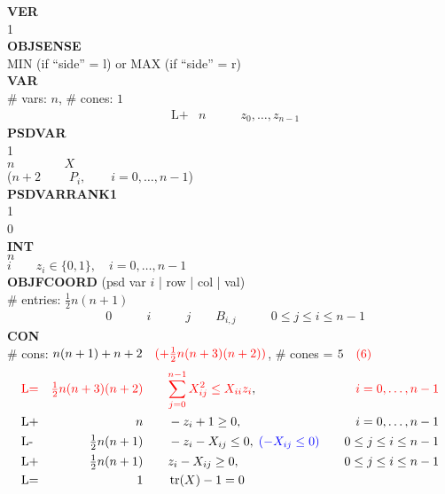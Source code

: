\documentclass[11pt,a4paper]{article}
\DeclareMathOperator{\tr}{tr}
\theoremstyle{definition}
\begin{document}
{\footnotesize
\noindent
\textbf{VER} \\
1 \\
\textbf{OBJSENSE} \\
MIN (if ``side'' = l) \; or \; MAX (if ``side'' = r) \\
\textbf{VAR} \\
\# vars:  $n$, \qquad \# cones: $1$ \\
\[
  \begin{aligned}
    &\text{L+} &n \qquad & z_0,\dots,z_{n-1}
  \end{aligned}
\]
\textbf{PSDVAR} \\
1  \\
$n \qquad \qquad X$ \\
{\color{red} ($n+2 \qquad \; P_i, \qquad i = 0,\dots,n-1$)}\\
{\color{green}\textbf{PSDVARRANK1}  \\
1 \\
0\\}
\textbf{INT} \\
$n$ \\
$i \qquad z_i \in \{0,1\}, \quad i = 0,\dots,n-1$ \\
\textbf{OBJFCOORD} (psd var $i$ | row | col | val) \\
\# entries: $\tfrac{1}{2}n(n+1)$\\
\[
  \begin{aligned}
    &0 \qquad &i \qquad &j \qquad B_{i,j} \qquad & 0\leq j \leq i \leq n-1
  \end{aligned}
\]
\textbf{CON} \\
\# cons: $n(n+1)+n+2 \quad {\color{red}(+\tfrac{1}{2}n(n+3)(n+2))}$, \qquad
\# cones = $5 \quad {\color{red} (6)}$\\
\[
  \begin{aligned}
    &{\color{red}\text{L=}} & {\color{red}\tfrac{1}{2}n(n+3)(n+2)} \qquad 
    &{\color{red} \sum_{j=0}^{n-1} X_{ij}^2 \leq X_{ii}z_i}, \quad &
    {\color{red} i = 0,\dots, n-1} \\
    &\text{L+} &n \qquad & -z_i + 1 \geq 0, \quad & i = 0,\dots,n-1 \\
    &\text{L-} &\tfrac{1}{2}n(n+1) \qquad & -z_i - X_{ij} \leq 0,\;
    {\color{blue} (-X_{ij} \leq 0)}\quad & 0
    \leq j \leq i \leq n-1 \\
    &\text{L+} &\tfrac{1}{2}n(n+1) \qquad & z_i - X_{ij} \geq 0,\quad & 0
    \leq j \leq i \leq n-1 \\
    &\text{L=}  &1 \qquad & \tr(X) - 1 = 0 \\

\end{aligned}\]}
\end{document}
